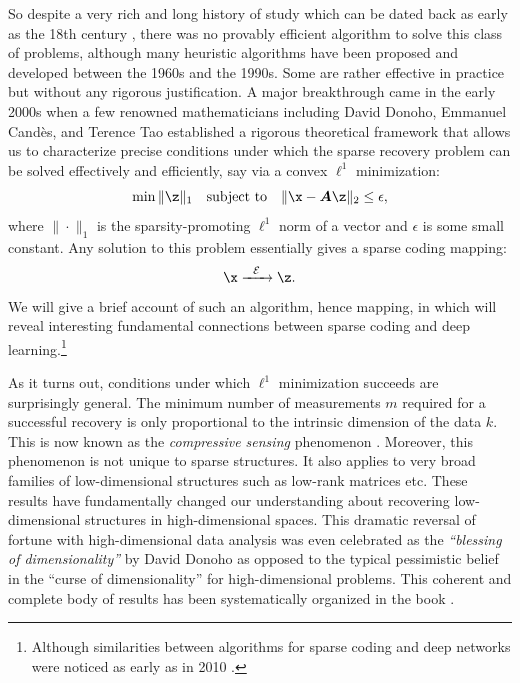 \documentclass[../../book-main.tex]{subfiles}
\begin{document}
So despite a very rich and long history of study which can be dated back as early as  the 18th century \cite{Boscovichca1750}, there was no provably efficient algorithm to solve this class of problems, although many heuristic algorithms have been proposed and developed between the 1960s and the 1990s. Some are rather effective in practice but without any rigorous justification. A major breakthrough came in the early 2000s when a few renowned mathematicians including David Donoho, Emmanuel Cand\`{e}s, and Terence Tao \cite{donoho2005neighborly,Candes2005,CandesE2005-IT} established a rigorous theoretical framework that allows us to characterize precise conditions under which the sparse recovery problem can be solved effectively and efficiently, say via a convex $\ell^1$ minimization:
\begin{equation}
    \min \|\z\|_1 \quad \mbox{subject to} \quad \| \x - \boldsymbol{A}\z\|_2 \le \epsilon,
\end{equation}
where $\|\cdot \|_1$ is the sparsity-promoting $\ell^1$ norm of a vector and $\epsilon$ is some small constant. Any solution to this problem essentially gives a sparse coding mapping:
\begin{equation}
    \x   \xrightarrow{\hspace{2mm} \mathcal{E} \hspace{2mm}}  \z.
       \label{eqn:decoding-sparse}
\end{equation}
We will give a brief account of such an algorithm, hence mapping, in  which will reveal interesting fundamental connections between sparse coding and deep learning.\footnote{Although similarities between algorithms for sparse coding and deep networks were noticed as early as in 2010 \cite{gregor2010learning}.}

As it turns out, conditions under which $\ell^1$ minimization succeeds are surprisingly general. The minimum number of measurements $m$ required for a successful recovery is only proportional to the intrinsic dimension of the data $k$. This is now known as the {\em compressive sensing} phenomenon \cite{CandesE2006-ICM}. Moreover, this phenomenon is not unique to sparse structures. It also applies to very broad families of low-dimensional structures such as low-rank matrices etc. These results have fundamentally changed our understanding about recovering low-dimensional structures in high-dimensional spaces. This dramatic reversal of fortune with high-dimensional data analysis was even celebrated as the {\em ``blessing of dimensionality''} by David Donoho \cite{DonohoD2000} as opposed to the typical pessimistic belief in the ``curse of dimensionality'' for high-dimensional problems. This coherent and complete body of results has been systematically organized in the book \cite{Wright-Ma-2022}. 
\end{document}
